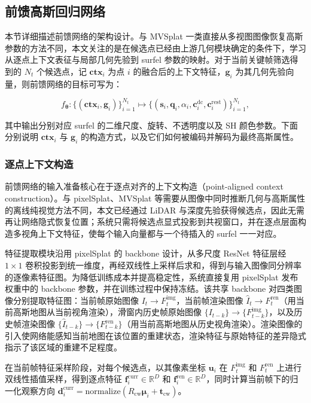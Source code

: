 \subsection{前馈高斯回归网络}

本节详细描述前馈网络的架构设计。与 MVSplat 一类直接从多视图图像恢复高斯参数的方法不同，本文关注的是在候选点已经由上游几何模块确定的条件下，学习从逐点上下文表征与局部几何先验到 surfel 参数的映射。对于当前关键帧筛选得到的 $N_t$ 个候选点，记 $\mathbf{ctx}_i$ 为点 $i$ 的融合后的上下文特征，$\mathbf{g}_i$ 为其几何先验向量，则前馈网络的目标可写为：

\begin{equation}
f_{\boldsymbol{\theta}} : \{(\mathbf{ctx}_i, \mathbf{g}_i)\}_{i=1}^{N_t}
\mapsto
\{(\mathbf{s}_i, \mathbf{q}_i, \alpha_i, \mathbf{c}_i^{\mathrm{dc}}, \mathbf{c}_i^{\mathrm{rest}})\}_{i=1}^{N_t},
\end{equation}

其中输出分别对应 surfel 的二维尺度、旋转、不透明度以及 SH 颜色参数。下面分别说明 $\mathbf{ctx}_i$ 与 $\mathbf{g}_i$ 的构造方式，以及它们如何被编码并解码为最终高斯属性。

\subsubsection{逐点上下文构造}

前馈网络的输入准备核心在于逐点对齐的上下文构造（point-aligned context construction）。与 pixelSplat、MVSplat 等需要从图像中同时推断几何与高斯属性的离线纯视觉方法不同，本文已经通过 LiDAR 与深度先验获得候选点，因此无需再让网络隐式恢复位置；系统只需将候选点显式投影到共视窗口，并在逐点层面构造多视角上下文特征，使每个输入向量都与一个待插入的 surfel 一一对应。

特征提取模块沿用 pixelSplat 的 backbone 设计，从多尺度 ResNet 特征层经 $1 \times 1$ 卷积投影到统一维度，再经双线性上采样后求和，得到与输入图像同分辨率的逐像素特征图。为降低训练成本并提高稳定性，系统直接复用 pixelSplat 发布权重中的 backbone 参数，并在训练过程中保持冻结。该共享 backbone 对四类图像分别提取特征图：当前帧原始图像 $I_t \to F_t^{\text{img}}$，当前帧渲染图像 $\hat{I}_t \to F_t^{\text{ren}}$（用当前高斯地图从当前视角渲染），滑窗内历史帧原始图像 $\{I_{t-k}\} \to \{F_{t-k}^{\text{img}}\}$，以及历史帧渲染图像 $\{\hat{I}_{t-k}\} \to \{F_{t-k}^{\text{ren}}\}$（用当前高斯地图从历史视角渲染）。渲染图像的引入使网络能感知当前地图在该位置的重建状态，渲染特征与原始特征的差异隐式指示了该区域的重建不足程度。

在当前帧特征采样阶段，对每个候选点，以其像素坐标 $\mathbf{u}_i$ 在 $F_t^{\text{img}}$ 和 $F_t^{\text{ren}}$ 上进行双线性插值采样，得到逐点特征 $\mathbf{f}_i^{\text{curr}} \in \mathbb{R}^{D}$ 和 $\mathbf{f}_i^{\text{ren}} \in \mathbb{R}^{D}$，同时计算当前帧下的归一化观察方向 $\mathbf{d}_i^{\text{curr}} = \text{normalize}(R_{\text{cw}} \boldsymbol{\mu}_i + \mathbf{t}_{\text{cw}})$。

